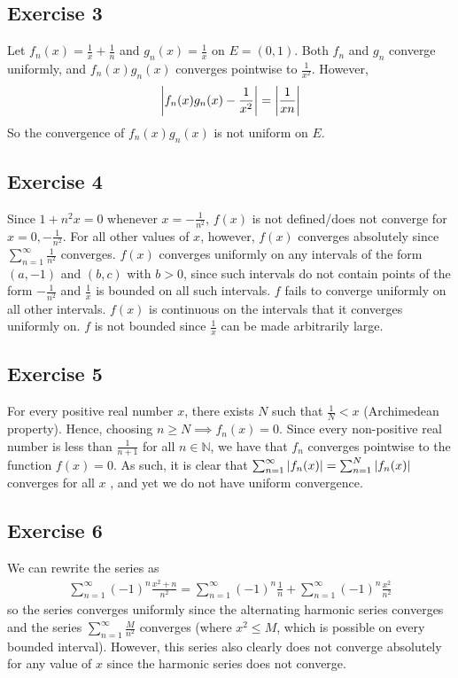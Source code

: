 \subsection{Exercise 3}
Let $f_n(x) = \frac{1}{x} + \frac{1}{n}$ and $g_n(x) = \frac{1}{x}$ on $E = (0, 1)$. 
Both $f_n$ and $g_n$ converge uniformly, and $f_n(x) g_n(x)$ converges pointwise to $\frac{1}{x^2}$. However,
\begin{align*}
        \abs{f_n(x) g_n(x) - \frac{1}{x^2}} = \abs{\frac{1}{xn}}
\end{align*}
So the convergence of $f_n(x) g_n(x)$ is not uniform on  $E$.

\subsection{Exercise 4}
Since $1 + n^2 x = 0$ whenever $x = -\frac{1}{n^2}$, $f(x)$ is not defined/does not converge for 
$x = 0, -\frac{1}{n^2}$. For all other values of  $x$, however, $f(x)$ converges absolutely since 
$\sum_{n = 1}^\infty \frac{1}{n^2}$ converges. $f(x)$ converges uniformly on any intervals of the form 
$(a, -1)$ and $(b, c)$ with $b > 0$, since such intervals do not contain points of the form $-\frac{1}{n^2}$
and $\frac{1}{x}$ is bounded on all such intervals. $f$ fails to converge uniformly on all other intervals.
$f(x)$ is continuous on the intervals that it converges uniformly on.
$f$ is not bounded since $\frac{1}{x}$ can be made arbitrarily large.

\subsection{Exercise 5}
For every positive real number $x$, there exists $N$ such that $\frac{1}{N} < x$ (Archimedean property). Hence,
choosing $n \geq N \implies f_n(x) = 0$. Since every non-positive real number is less than $\frac{1}{n + 1}$ 
for all $n \in \mathbb{N}$, we have that $f_n$ converges pointwise to the function $f(x) = 0$. 
As such, it is clear that $\sum_{n = 1}^\infty \abs{f_n(x)} = \sum_{n = 1}^N \abs{f_n(x)}$ converges for all $x$
, and yet we do not have uniform convergence.

\subsection{Exercise 6}
We can rewrite the series as
\begin{align*}
        \sum_{n = 1}^\infty (-1)^n \frac{x^2 + n}{n^2} = \sum_{n = 1}^\infty (-1)^n \frac{1}{n} + \sum_{n = 1}^\infty (-1)^n \frac{x^2}{n^2}
\end{align*}
so the series converges uniformly since the alternating harmonic series converges and the series 
$\sum_{n = 1}^\infty \frac{M}{n^2}$ converges (where $x^2 \leq M$, which is possible on every bounded interval).
However, this series also clearly does not converge absolutely for any value of $x$ since the harmonic
series does not converge.

